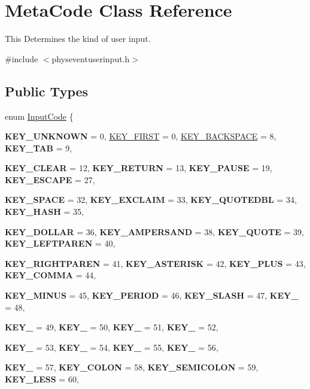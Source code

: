 \hypertarget{classMetaCode}{
\section{MetaCode Class Reference}
\label{d7/d72/classMetaCode}
}


This Determines the kind of user input.  


{\ttfamily \#include $<$physeventuserinput.h$>$}\subsection*{Public Types}
\begin{DoxyCompactItemize}
\item 
enum \hyperlink{classMetaCode_a7390e6f58e25c0ce377bba4e63081b24}{InputCode} \{ \par
{\bfseries KEY\_\-UNKNOWN} =  0, 
\hyperlink{classMetaCode_a7390e6f58e25c0ce377bba4e63081b24af7c19e29f8e1299858f9a9a0e2e0df32}{KEY\_\-FIRST} =  0, 
\hyperlink{classMetaCode_a7390e6f58e25c0ce377bba4e63081b24a11be427f22c538fc5682e0b7fa3e1e6d}{KEY\_\-BACKSPACE} =  8, 
{\bfseries KEY\_\-TAB} =  9, 
\par
{\bfseries KEY\_\-CLEAR} =  12, 
{\bfseries KEY\_\-RETURN} =  13, 
{\bfseries KEY\_\-PAUSE} =  19, 
{\bfseries KEY\_\-ESCAPE} =  27, 
\par
{\bfseries KEY\_\-SPACE} =  32, 
{\bfseries KEY\_\-EXCLAIM} =  33, 
{\bfseries KEY\_\-QUOTEDBL} =  34, 
{\bfseries KEY\_\-HASH} =  35, 
\par
{\bfseries KEY\_\-DOLLAR} =  36, 
{\bfseries KEY\_\-AMPERSAND} =  38, 
{\bfseries KEY\_\-QUOTE} =  39, 
{\bfseries KEY\_\-LEFTPAREN} =  40, 
\par
{\bfseries KEY\_\-RIGHTPAREN} =  41, 
{\bfseries KEY\_\-ASTERISK} =  42, 
{\bfseries KEY\_\-PLUS} =  43, 
{\bfseries KEY\_\-COMMA} =  44, 
\par
{\bfseries KEY\_\-MINUS} =  45, 
{\bfseries KEY\_\-PERIOD} =  46, 
{\bfseries KEY\_\-SLASH} =  47, 
{\bfseries KEY\_} =  48, 
\par
{\bfseries KEY\_} =  49, 
{\bfseries KEY\_} =  50, 
{\bfseries KEY\_} =  51, 
{\bfseries KEY\_} =  52, 
\par
{\bfseries KEY\_} =  53, 
{\bfseries KEY\_} =  54, 
{\bfseries KEY\_} =  55, 
{\bfseries KEY\_} =  56, 
\par
{\bfseries KEY\_} =  57, 
{\bfseries KEY\_\-COLON} =  58, 
{\bfseries KEY\_\-SEMICOLON} =  59, 
{\bfseries KEY\_\-LESS} =  60, 
\par

\end{DoxyCompactItemize}
